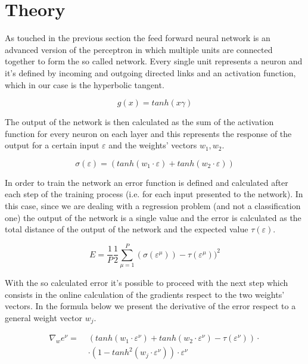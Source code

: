 \section{Theory}
\label{sec:theory}

As touched in the previous section the feed forward neural network is an advanced version of the
perceptron in which multiple units are connected together to form the so called network. Every
single unit represents a neuron and it's defined by incoming and outgoing directed links and
an activation function, which in our case is the hyperbolic tangent.

\begin{equation}
    \label{eq:single-unit-activation-fun}
    g(x) = tanh(x\gamma)
\end{equation}

The output of the network is then calculated as the sum of the activation function for every neuron
on each layer and this represents the response of the output for a certain input $\varepsilon$ and the
weights' vectors $w_1, w_2$.

\begin{equation}
    \sigma (\varepsilon) = (tanh(w_1 \cdotp \varepsilon) + tanh(w_2 \cdotp \varepsilon))
\end{equation}

In order to train the network an error function is defined and calculated after each step of the training process
(i.e. for each input presented to the network). In this case, since we are dealing with a regression problem (and not
a classification one) the output of the network is a single value and the error is calculated as the total distance of
the output of the network and the expected value $\tau(\varepsilon)$.

\begin{equation}
    E = \frac{1}{P}\frac{1}{2} \sum_{\mu = 1}^{P} (\sigma(\varepsilon^\mu)) - \tau(\varepsilon^\mu))^2
\end{equation}

With the so calculated error it's possible to proceed with the next step which consists in the online
calculation of the gradients respect to the two weights' vectors. In the formula below we present the
derivative of the error respect to a general weight vector $w_j$.

\begin{equation} \label{eq:gradient-gen-weight}
    \begin{split}
        \nabla_w e^\nu =\; & (tanh(w_1 \cdotp \varepsilon^\nu) + tanh(w_2 \cdotp \varepsilon^\nu) - \tau(\varepsilon^\nu)) \cdotp\\
        & \cdotp (1 - tanh^2(w_j \cdotp \varepsilon^\nu)) \cdotp \varepsilon^\nu
    \end{split}
\end{equation}

